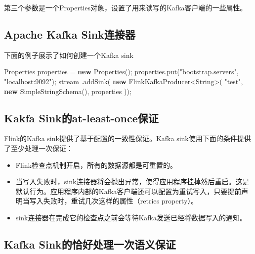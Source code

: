 \documentclass[cn,11pt,chinese]{elegantbook}
\newenvironment{Shaded}{}{}
\newcommand{\BuiltInTok}[1]{#1}
\newcommand{\FunctionTok}[1]{\textcolor[rgb]{0.02,0.16,0.49}{#1}}
\newcommand{\KeywordTok}[1]{\textcolor[rgb]{0.00,0.44,0.13}{\textbf{#1}}}
\newcommand{\NormalTok}[1]{#1}
\newcommand{\StringTok}[1]{\textcolor[rgb]{0.25,0.44,0.63}{#1}}
\providecommand{\tightlist}{%
  \setlength{\itemsep}{0pt}\setlength{\parskip}{0pt}}
\begin{document}
第三个参数是一个Properties对象，设置了用来读写的Kafka客户端的一些属性。

\hypertarget{apache-kafka-sinkux8fdeux63a5ux5668}{%
\subsection{Apache Kafka
Sink连接器}\label{apache-kafka-sinkux8fdeux63a5ux5668}}

下面的例子展示了如何创建一个Kafka sink

\begin{Shaded}
\begin{Highlighting}[]
\BuiltInTok{Properties}\NormalTok{ properties = }\KeywordTok{new} \BuiltInTok{Properties}\NormalTok{();}
\NormalTok{properties.}\FunctionTok{put}\NormalTok{(}\StringTok{"bootstrap.servers"}\NormalTok{, }\StringTok{"localhost:9092"}\NormalTok{);}
\NormalTok{stream}
\NormalTok{    .}\FunctionTok{addSink}\NormalTok{(}
        \KeywordTok{new}\NormalTok{ FlinkKafkaProducer\textless{}}\BuiltInTok{String}\NormalTok{\textgreater{}(}
            \StringTok{"test"}\NormalTok{,}
            \KeywordTok{new} \FunctionTok{SimpleStringSchema}\NormalTok{(),}
\NormalTok{            properties}
\NormalTok{    ));}
\end{Highlighting}
\end{Shaded}

\hypertarget{kakfa-sinkux7684at-least-onceux4fddux8bc1}{%
\subsection{Kakfa
Sink的at-least-once保证}\label{kakfa-sinkux7684at-least-onceux4fddux8bc1}}

Flink的Kafka sink提供了基于配置的一致性保证。Kafka
sink使用下面的条件提供了至少处理一次保证：

\begin{itemize}
\tightlist
\item
  Flink检查点机制开启，所有的数据源都是可重置的。
\item
  当写入失败时，sink连接器将会抛出异常，使得应用程序挂掉然后重启。这是默认行为。应用程序内部的Kafka客户端还可以配置为重试写入，只要提前声明当写入失败时，重试几次这样的属性（retries
  property）。
\item
  sink连接器在完成它的检查点之前会等待Kafka发送已经将数据写入的通知。
\end{itemize}

\hypertarget{kafka-sinkux7684ux6070ux597dux5904ux7406ux4e00ux6b21ux8bedux4e49ux4fddux8bc1}{%
\subsection{Kafka
Sink的恰好处理一次语义保证}\label{kafka-sinkux7684ux6070ux597dux5904ux7406ux4e00ux6b21ux8bedux4e49ux4fddux8bc1}}
\end{document}

